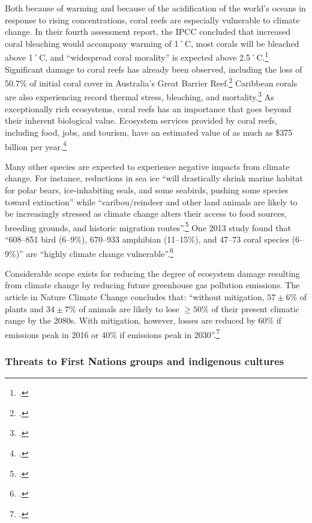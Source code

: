 Both because of warming and because of the acidification of the world's oceans in response to rising  concentrations, coral reefs are especially vulnerable to climate change.
In their fourth assessment report, the IPCC concluded that increased coral bleaching would accompany warming of 1˚C, most corals will be bleached above 1˚C, and ``widespread coral morality'' is expected above 2.5˚C.\footcite[][p.51]{IPCCar4_syr}
Significant damage to coral reefs has already been observed, including the loss of 50.7\% of initial coral cover in Australia's Great Barrier Reef.\footcite[][]{27declinecoral}
Caribbean corals are also experiencing record thermal stress, bleaching, and mortality.\footcite[][]{CaribbeanCorals}
As exceptionally rich ecosystems, coral reefs has an importance that goes beyond their inherent biological value.
Ecosystem services provided by coral reefs, including food, jobs, and tourism, have an estimated value of as much as \$375 billion per year.\footcite[][]{NOAACoral}



Many other species are expected to experience negative impacts from climate change.
For instance, reductions in sea ice ``will drastically shrink marine habitat for polar bears, ice-inhabiting seals, and some seabirds, pushing some species toward extinction'' while ``caribou/reindeer and other land animals are likely to be increasingly stressed as climate change alters their access to food sources, breeding grounds, and historic migration routes''.\footcite[][Executive summary, p. 10]{ACIA2004}
One 2013 study found that ``608–851 bird (6–9\%), 670–933 amphibian (11–15\%), and 47–73 coral species (6–9\%)'' are ``highly climate change vulnerable''.\footcite[][p. 1]{VulnerableSpecies}


Considerable scope exists for reducing the degree of ecosystem damage resulting from climate change by reducing future greenhouse gas pollution emissions.
The article in Nature Climate Change concludes that: ``without mitigation, $57 \pm 6\%$ of plants and $34 \pm 7\%$ of animals are likely to lose $\ge 50\%$ of their present climatic range by the 2080s. With mitigation, however, losses are reduced by 60\% if emissions peak in 2016 or 40\% if emissions peak in 2030''.\footcite[][]{WarrenBiodiversity}



	\subsubsection{Threats to First Nations groups and indigenous cultures}



